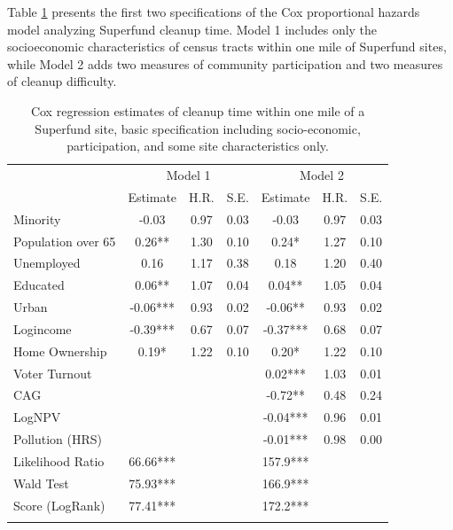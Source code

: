 \documentclass[12pt]{article}
\begin{document}
Table \ref{cox1} presents the first two specifications of the Cox proportional hazards model analyzing Superfund cleanup time. Model 1 includes only the socioeconomic characteristics of census tracts within one mile of Superfund sites, while Model 2 adds two measures of community participation and two measures of cleanup difficulty. 

\begin{table}[t]
	\centering	\footnotesize
	\caption{\small Cox regression estimates of cleanup time within one mile of a Superfund site, basic specification including socio-economic, participation, and some site characteristics only.} \label{cox1}
	\tabcolsep 9pt
		\begin{tabular}{lccc|ccc}
			\hline 
			& \multicolumn{3}{c}{Model 1 } & \multicolumn{3}{c}{Model 2 } \\ 
			& \multicolumn{1}{c}{Estimate}  & \multicolumn{1}{c}{H.R.}   & \multicolumn{1}{c}{S.E.}   & \multicolumn{1}{c}{Estimate}  & \multicolumn{1}{c}{H.R.}   & \multicolumn{1}{c}{S.E.}\\ \hline
			Minority & -0.03 & 0.97  & 0.03  & -0.03 & 0.97  & 0.03 \\
			Population over 65  &  0.26** & 1.30  & 0.10  &  0.24* & 1.27  & 0.10 \\
			Unemployed & 0.16  & 1.17  & 0.38  & 0.18  & 1.20  & 0.40 \\
			Educated &  0.06** & 1.07  & 0.04  &  0.04** & 1.05  & 0.04 \\
			Urban & -0.06*** & 0.93  & 0.02  & -0.06** & 0.93  & 0.02 \\
			Logincome & -0.39*** & 0.67  & 0.07  & -0.37*** & 0.68  & 0.07 \\
			Home Ownership &  0.19* & 1.22  & 0.10  &  0.20* & 1.22  & 0.10 \\
			Voter Turnout  &       &       &       &  0.02*** & 1.03  & 0.01 \\
			CAG   &       &       &       & -0.72** & 0.48  & 0.24 \\
			LogNPV &       &       &       & -0.04*** & 0.96  & 0.01 \\
			Pollution (HRS) &       &       &       & -0.01*** & 0.98  & 0.00 \\
			\hline
			Likelihood Ratio & 66.66***  & & &
			157.9*** &  & \\ 
			Wald Test & 75.93*** & & &
			166.9*** & & \\
			Score (LogRank) & 77.41*** & & &
			172.2*** &  & \\
			\hline
			\addlinespace[1ex]
			\multicolumn{3}{l}{\textsuperscript{***}$p\leq0.001$, 
				\textsuperscript{**}$p\leq0.01$, 
				\textsuperscript{*}$p\leq0.05$}
	\end{tabular}
\end{table}
\end{document}

